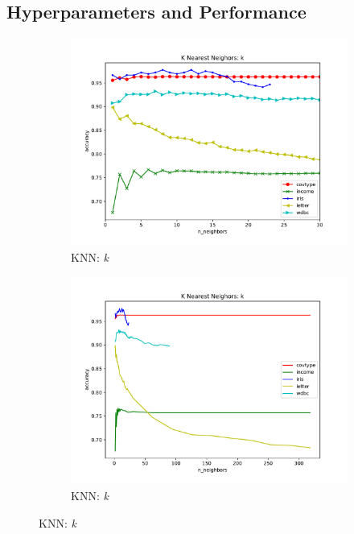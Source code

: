 \documentclass[twoside,11pt]{article}
\begin{document}
		\subsection{Hyperparameters and Performance}
			\begin{figure}[h]
				\centering
				
				\begin{subfigure}[b]{.45\linewidth}
					\includegraphics[width=\linewidth]{knn_hyperparam_zoomed}
					\caption{KNN: \textit{k}}
					\label{fig:hyperparam_knn_zoomed}
				\end{subfigure}
				\begin{subfigure}[b]{.45\linewidth}
					\includegraphics[width=\linewidth]{knn_hyperparam_all}
					\caption{KNN: \textit{k}}
					\label{fig:hyperparam_knn_all}
				\end{subfigure}
			

\end{figure}
\end{document}
